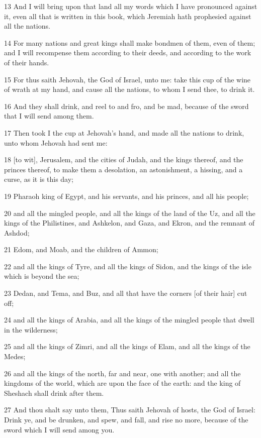 \par 13 And I will bring upon that land all my words which I have pronounced against it, even all that is written in this book, which Jeremiah hath prophesied against all the nations.
\par 14 For many nations and great kings shall make bondmen of them, even of them; and I will recompense them according to their deeds, and according to the work of their hands.
\par 15 For thus saith Jehovah, the God of Israel, unto me: take this cup of the wine of wrath at my hand, and cause all the nations, to whom I send thee, to drink it.
\par 16 And they shall drink, and reel to and fro, and be mad, because of the sword that I will send among them.
\par 17 Then took I the cup at Jehovah's hand, and made all the nations to drink, unto whom Jehovah had sent me:
\par 18 [to wit], Jerusalem, and the cities of Judah, and the kings thereof, and the princes thereof, to make them a desolation, an astonishment, a hissing, and a curse, as it is this day;
\par 19 Pharaoh king of Egypt, and his servants, and his princes, and all his people;
\par 20 and all the mingled people, and all the kings of the land of the Uz, and all the kings of the Philistines, and Ashkelon, and Gaza, and Ekron, and the remnant of Ashdod;
\par 21 Edom, and Moab, and the children of Ammon;
\par 22 and all the kings of Tyre, and all the kings of Sidon, and the kings of the isle which is beyond the sea;
\par 23 Dedan, and Tema, and Buz, and all that have the corners [of their hair] cut off;
\par 24 and all the kings of Arabia, and all the kings of the mingled people that dwell in the wilderness;
\par 25 and all the kings of Zimri, and all the kings of Elam, and all the kings of the Medes;
\par 26 and all the kings of the north, far and near, one with another; and all the kingdoms of the world, which are upon the face of the earth: and the king of Sheshach shall drink after them.
\par 27 And thou shalt say unto them, Thus saith Jehovah of hosts, the God of Israel: Drink ye, and be drunken, and spew, and fall, and rise no more, because of the sword which I will send among you.
